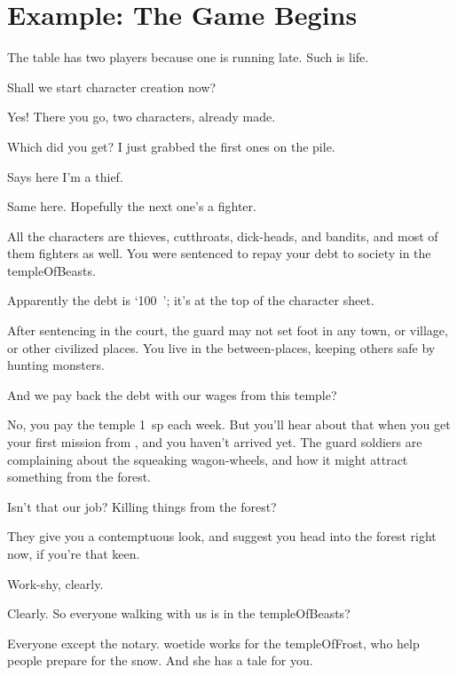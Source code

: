 \section{Example: The Game Begins}

\begin{multicols}{3}

\noindent
The table has two players because one is running late.
Such is life.


\begin{description}\sf
  \item[Player 1:]
  Shall we start character creation now?
  \item[\Glsentrytext{gm}:]
  Yes!
  There you go, two characters, already made.

  Which did you get?
  I just grabbed the first ones on the pile.
  \item[Player 2:]
  Says here I'm a thief.
  \item[Player 1:]
  Same here.
  Hopefully the next one's a fighter.
  \item[\Glsentrytext{gm}:]
  All the characters are thieves, cutthroats, dick-heads, and bandits, and most of them fighters as well.
  You were sentenced to repay your debt to society in the \gls{templeOfBeasts}.
  \item[Player 1:]
  Apparently the debt is `100~'; it's at the top of the character sheet.
  \item[\Gls{gm}:]
  After sentencing in the \gls{court}, the \gls{guard} may not set foot in any town, or \gls{village}, or other civilized places.
  You live in the between-places, keeping others safe by hunting \glspl{monster}.
  \item[Player 1:]
  And we pay back the debt with our wages from this \gls{temple}?
  \item[\Gls{gm}:]
  No, you pay the \gls{temple} 1~\gls{sp} each week.
  But you'll hear about that when you get your first mission from , and you haven't arrived yet.
  The \gls{guard} \glspl{soldier} are complaining about the squeaking wagon-wheels, and how it might attract something from the forest.
  \item[Player 2:]
  Isn't that our job?
  Killing things from the forest?
  \item[\Gls{gm}:]
  They give you a contemptuous look, and suggest you head into the forest right now, if you're that keen.
  \item[Player 2:]
  Work-shy, clearly.
  \item[Player 1:]
  Clearly.
  So everyone walking with us is in the \gls{templeOfBeasts}?
  \item[\Gls{gm}:]
  Everyone except the \gls{notary}.
  \Gls{woetide} works for the \gls{templeOfFrost}, who help people prepare for the snow.
  And she has a tale for you.


\end{description}
\end{multicols}
